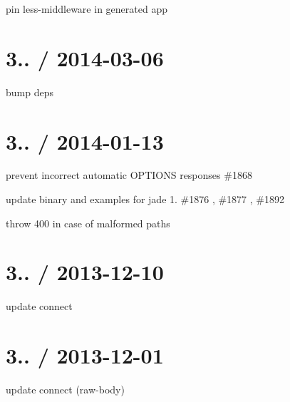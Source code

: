 {\ttfamily }

{\ttfamily 
\begin{DoxyItemize}
\item pin less-\/middleware in generated app
\end{DoxyItemize}}

{\ttfamily \section*{3.. / 2014-\/03-\/06 }}

{\ttfamily }

{\ttfamily 
\begin{DoxyItemize}
\item bump deps
\end{DoxyItemize}}

{\ttfamily \section*{3.. / 2014-\/01-\/13 }}

{\ttfamily }

{\ttfamily 
\begin{DoxyItemize}
\item prevent incorrect automatic O\+P\+T\+I\+O\+NS responses \#1868 
\item update binary and examples for jade 1. \#1876 , \#1877 , \#1892 
\item throw 400 in case of malformed paths 
\end{DoxyItemize}}

{\ttfamily \section*{3.. / 2013-\/12-\/10 }}

{\ttfamily }

{\ttfamily 
\begin{DoxyItemize}
\item update connect
\end{DoxyItemize}}

{\ttfamily \section*{3.. / 2013-\/12-\/01 }}

{\ttfamily }

{\ttfamily 
\begin{DoxyItemize}
\item update connect (raw-\/body)
\end{DoxyItemize}}

